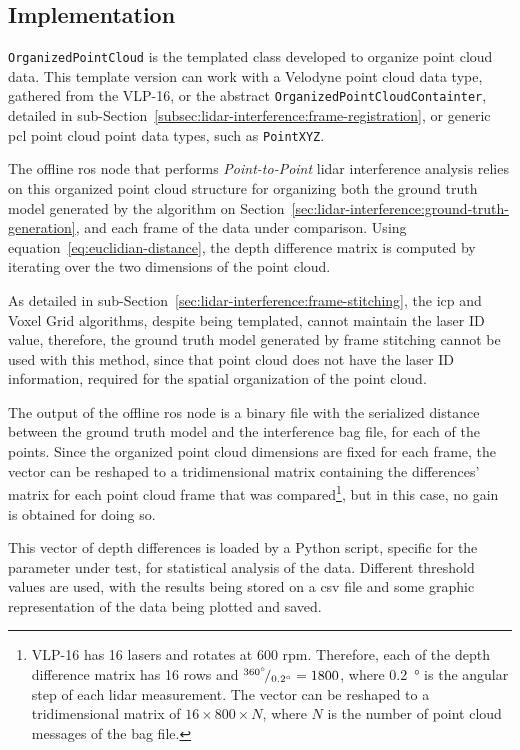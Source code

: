 \subsection{Implementation}
\texttt{OrganizedPointCloud} is the templated class developed to organize point cloud data. This template version can work with a Velodyne point cloud data type, gathered from the VLP-16, or the abstract \texttt{OrganizedPointCloudContainter}, detailed in sub-Section~\ref{subsec:lidar-interference:frame-registration}, or generic \ac{pcl} point cloud point data types, such as \texttt{PointXYZ}.

The offline \ac{ros} node that performs \textit{Point-to-Point} \ac{lidar} interference analysis relies on this organized point cloud structure for organizing both the ground truth model generated by the algorithm on Section~\ref{sec:lidar-interference:ground-truth-generation}, and each frame of the data under comparison. Using equation~\ref{eq:euclidian-distance}, the depth difference matrix is computed by iterating over the two dimensions of the point cloud. 

As detailed in sub-Section~\ref{sec:lidar-interference:frame-stitching}, the \ac{icp} and Voxel Grid algorithms, despite being templated, cannot maintain the \ac{laser} ID value, therefore, the ground truth model generated by frame stitching cannot be used with this method, since that point cloud does not have the \ac{laser} ID information, required for the spatial organization of the point cloud.

The output of the offline \ac{ros} node is a binary file with the serialized distance between the ground truth model and the interference bag file, for each of the points. Since the organized point cloud dimensions are fixed for each frame, the vector can be reshaped to a tridimensional matrix containing the differences' matrix for each point cloud frame that was compared\footnote{VLP-16 has 16 lasers and rotates at 600 \ac{rpm}. Therefore, each of the depth difference matrix has 16 rows and ${}^{\SI{360}{\degree}}\!/_{\SI{0.2}{\degree}} = 1800$, where \SI{0.2}{\degree} is the angular step of each \ac{lidar} measurement. The vector can be reshaped to a tridimensional matrix of $16\times 800\times N$, where $N$ is the number of point cloud messages of the bag file.}, but in this case, no gain is obtained for doing so.

This vector of depth differences is loaded by a Python script, specific for the parameter under test, for statistical analysis of the data. Different threshold values are used, with the results being stored on a \ac{csv} file and some graphic representation of the data being plotted and saved.

